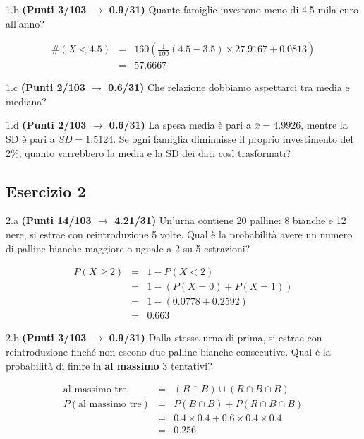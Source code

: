 \documentclass[
  11pt,
]{book}
\theoremstyle{mytheoremstyle}
\theoremstyle{mydefstyle}
\newenvironment{sol}
  {
  \begin{tcolorbox}[enhanced,breakable,arc=0.1mm,boxrule=1pt,colback=white,colframe=iblue,
  title=\bf \fontfamily{lmss}\selectfont \hspace{.5 cm} Soluzione,drop fuzzy shadow]

}{
\end{tcolorbox}
  }
\begin{document}
1.b \textbf{(Punti 3/103 \(\rightarrow\) 0.9/31)} Quante famiglie investono meno di 4.5 mila euro all'anno?

\begin{sol}
\begin{eqnarray*}
  \#(X<4.5) &=&  160(\frac1{100}(4.5-3.5)\times27.9167+0.0813)\\
  &=& 57.6667
\end{eqnarray*}

\end{sol}

1.c \textbf{(Punti 2/103 \(\rightarrow\) 0.6/31)} Che relazione dobbiamo aspettarci tra media e mediana?

1.d \textbf{(Punti 2/103 \(\rightarrow\) 0.6/31)} La spesa media è pari a \(\bar x=4.9926\), mentre la SD è pari a \(SD=1.5124\).
Se ogni famiglia diminuisse il proprio investimento del 2\%, quanto varrebbero la media e la SD dei dati così trasformati?

\subsection{Esercizio 2}\label{esercizio-2-21}

2.a \textbf{(Punti 14/103 \(\rightarrow\) 4.21/31)} Un'urna contiene 20 palline: 8 bianche e 12 nere, si estrae con reintroduzione 5 volte.
Qual è la probabilità avere un numero di palline bianche maggiore o uguale a 2 su 5 estrazioni?

\begin{sol}
\begin{eqnarray*}
  P(X\ge 2) &=&  1-P(X<2)\\
  &=& 1-(P(X=0)+P(X=1))\\
  &=& 1-(0.0778+0.2592)\\
  &=& 0.663
\end{eqnarray*}

\end{sol}

2.b \textbf{(Punti 3/103 \(\rightarrow\) 0.9/31)} Dalla stessa urna di prima, si estrae con reintroduzione finché non escono due palline bianche consecutive. Qual è la probabilità di finire in \textbf{al massimo} 3 tentativi?

\begin{sol}
\begin{eqnarray*}
  \text{al massimo tre} &=& (B\cap B)\cup(R\cap B\cap B )\\
  P(\text{al massimo tre}) &=& P(B\cap B)+P(R\cap B\cap B)\\
  &=&0.4\times 0.4 +0.6\times 0.4\times 0.4\\
  &=& 0.256
\end{eqnarray*}

\end{sol}
\end{document}
